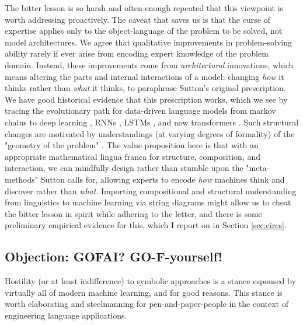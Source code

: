 The bitter lesson is so harsh and often-enough repeated that this viewpoint is worth addressing proactively. The caveat that saves us is that the curse of expertise applies only to the object-language of the problem to be solved, not model architectures. We agree that qualitative improvements in problem-solving ability rarely if ever arise from encoding expert knowledge of the problem domain. Instead, these improvements come from \emph{architectural} innovations, which means altering the parts and internal interactions of a model: changing \emph{how} it thinks rather than \emph{what} it thinks, to paraphrase Sutton's original prescription. We have good historical evidence that this prescription works, which we see by tracing the evolutionary path for data-driven language models from markov chains to deep learning \citep{lecunDeepLearning2015a}, RNNs \citep{rumelhartLearningInternalRepresentations1987}, LSTMs \citep{hochreiterLongShortTermMemory1997}, and now transformers \citep{vaswaniAttentionAllYou2017}. Such structural changes are motivated by understandings (at varying degrees of formality) of the "geometry of the problem" \citep{bronsteinGeometricDeepLearning2021}. The value proposition here is that with an appropriate mathematical lingua franca for structure, composition, and interaction, we can mindfully design rather than stumble upon the "meta-methods" Sutton calls for, allowing experts to encode \emph{how} machines think and discover rather than \emph{what}. Importing compositional and structural understanding from linguistics to machine learning via string diagrams might allow us to cheat the bitter lesson in spirit while adhering to the letter, and there is some preliminary empirical evidence for this, which I report on in Section \ref{sec:circs}.

\subsection{\textbf{Objection:} GOFAI? GO-F-yourself!}
 
Hostility (or at least indifference) to symbolic approaches is a stance espoused by virtually all of modern machine learning, and for good reasons. This stance is worth elaborating and steelmanning for pen-and-paper-people in the context of engineering language applications.\\

